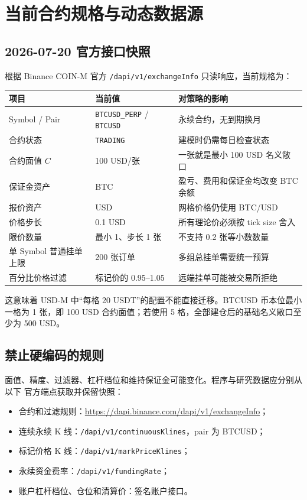\documentclass[11pt,a4paper,fontset=none]{ctexart}
\begin{document}
\section{当前合约规格与动态数据源}

\subsection{2026-07-20 官方接口快照}

根据 Binance COIN-M 官方 \texttt{/dapi/v1/exchangeInfo} 只读响应，当前规格为：

\begin{longtable}{p{4.0cm}p{4.0cm}p{5.6cm}}
  \toprule
  项目 & 当前值 & 对策略的影响 \\
  \midrule
  \endhead
  Symbol / Pair & \texttt{BTCUSD\_PERP} / \texttt{BTCUSD} & 永续合约，无到期换月 \\
  合约状态 & \texttt{TRADING} & 建模时仍需每日检查状态 \\
  合约面值 $C$ & 100 USD/张 & 一张就是最小 100 USD 名义敞口 \\
  保证金资产 & BTC & 盈亏、费用和保证金均改变 BTC 余额 \\
  报价资产 & USD & 网格价格仍使用 BTC/USD \\
  价格步长 & 0.1 USD & 所有理论价必须按 tick size 舍入 \\
  限价数量 & 最小 1、步长 1 张 & 不支持 0.2 张等小数数量 \\
  单 Symbol 普通挂单上限 & 200 张订单 & 多组总挂单需要统一预算 \\
  百分比价格过滤 & 标记价的 0.95--1.05 & 远端挂单可能被交易所拒绝 \\
  \bottomrule
\end{longtable}

这意味着 USD-M 中“每格 20 USDT”的配置不能直接迁移。BTCUSD 币本位最小一格为
1 张，即 100 USD 合约面值；若使用 5 格，全部建仓后的基础名义敞口至少为 500 USD。

\subsection{禁止硬编码的规则}

面值、精度、过滤器、杠杆档位和维持保证金可能变化。程序与研究数据应分别从以下
官方端点获取并保留快照：

\begin{itemize}
  \item 合约和过滤规则：\url{https://dapi.binance.com/dapi/v1/exchangeInfo}；
  \item 连续永续 K 线：\texttt{/dapi/v1/continuousKlines}，pair 为 BTCUSD；
  \item 标记价格 K 线：\texttt{/dapi/v1/markPriceKlines}；
  \item 永续资金费率：\texttt{/dapi/v1/fundingRate}；
  \item 账户杠杆档位、仓位和清算价：签名账户接口。
\end{itemize}
\end{document}
